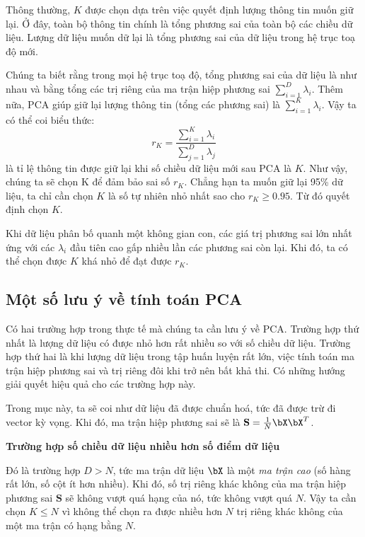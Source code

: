 	 Thông thường, $K$ được chọn dựa trên việc {quyết định lượng thông tin muốn giữ lại}. Ở đây, toàn bộ thông tin chính là tổng phương sai của toàn bộ các chiều dữ liệu. Lượng dữ liệu muốn dữ lại là tổng phương sai của dữ liệu trong hệ trục toạ độ mới.
	 
	 Chúng ta biết rằng trong mọi hệ trục toạ độ, tổng phương sai của dữ liệu là như nhau 	 và bằng tổng các trị riêng của ma trận hiệp phương sai $\sum_{i=1}^D 	 \lambda_i$. Thêm nữa, PCA giúp giữ lại lượng thông tin (tổng các phương sai) là
	 $\sum_{i=1}^K \lambda_i$. Vậy ta có thể coi biểu thức:
	 \begin{equation}
	 \label{eqn:28_6}
	 r_K = \frac{\sum_{i=1}^K \lambda_i}{\sum_{j=1}^D \lambda_j}
	 \end{equation}
	 là tỉ lệ thông tin được giữ lại khi số chiều dữ liệu mới sau PCA là $K$. Như 	 vậy, chúng ta sẽ chọn K để đảm bảo sai số $r_K$. Chẳng hạn ta muốn giữ lại 95\% dữ liệu, ta chỉ cần chọn $K$ là số tự nhiên 	 nhỏ nhất sao cho $r_K \geq 0.95$. Từ đó quyết định chọn $K$.
	 
	 Khi dữ liệu phân bố quanh một không gian con, các giá trị phương sai lớn nhất 	 ứng với các $\lambda_i$ đầu tiên cao gấp nhiều lần các phương sai còn lại. 	 Khi đó, ta có thể chọn được $K$ khá nhỏ để đạt được $r_K$.
	 
	 
	 \subsection{Một số lưu ý về tính toán PCA}
	 Có hai trường hợp trong thực tế mà chúng ta cần lưu ý về PCA. Trường hợp thứ
	 nhất là lượng dữ liệu có được nhỏ hơn rất nhiều so với số chiều dữ liệu. Trường
	 hợp thứ hai là khi lượng dữ liệu trong tập huấn luyện rất lớn, việc tính toán ma trận hiệp phương sai và trị riêng đôi khi trở nên
	 bất khả thi. Có những hướng giải quyết hiệu quả cho các trường hợp này.
	 
	 {Trong mục này, ta sẽ coi như dữ liệu đã được chuẩn hoá, tức đã được trừ đi
	 	vector kỳ vọng. Khi đó, ma trận hiệp phương sai sẽ là $\mathbf{S} =
	 	\frac{1}{N}\bX\bX^T$.}
	 
	 \textbf{Trường hợp số chiều dữ liệu nhiều hơn số điểm dữ liệu}
	 
	 Đó là trường hợp $D > N$, tức ma trận dữ liệu $\bX$ là một \textit{ma trận cao} (số hàng rất lớn, số cột ít hơn nhiều).
	 Khi đó, số trị riêng khác không của ma trận hiệp phương sai $\mathbf{S}$ sẽ
	 không vượt quá hạng của nó, tức không vượt quá $N$. Vậy ta cần chọn $K \leq N$
	 vì không thể chọn ra được nhiều hơn $N$ trị riêng khác không của một ma trận có hạng
	 bằng $N$.
	 
